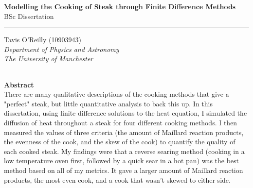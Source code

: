 \documentclass[11pt]{article}
\begin{document}
	
	\begin{titlepage}
		\begin{center}
			
			\vspace{0.025\textheight} %
			
			{\huge \textbf{Modelling the Cooking of Steak through Finite Difference Methods}}\\[0.3cm]
			
			{\Large BSc Dissertation}
			
			\vspace{0.025\textheight} %
			\rule{0.3\textwidth}{0.4pt} %
			\vspace{0.025\textheight} %
			
			Tavis O'Reilly (10903943)\\[0.3cm]
			\textit{Department of Physics and Astronomy}\\[0.3cm]
			\textit{The University of Manchester}\\[0.3cm]
			\shortmonthname[\the\month]  \the\year \\[2cm]
			
		\end{center}
		
		\vspace{0.1\textheight} %
		
		{\Large \textbf{Abstract}}\\
		
		There are many qualitative descriptions of the cooking methods that give a "perfect" steak, but little quantitative analysis to back this up. In this dissertation, using finite difference solutions to the heat equation, I simulated the diffusion of heat throughout a steak for four different cooking methods. I then measured the values of three criteria (the amount of Maillard reaction products, the evenness of the cook, and the skew of the cook) to quantify the quality of each cooked steak. My findings were that a reverse searing method (cooking in a low temperature oven first, followed by a quick sear in a hot pan) was the best method based on all of my metrics. It gave a larger amount of Maillard reaction products, the most even cook, and a cook that wasn't skewed to either side.
		
		\vfill
	\end{titlepage}
	
\end{document}
